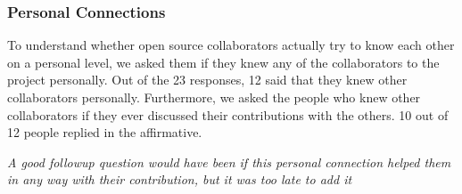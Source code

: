 \subsubsection{Personal Connections}

To understand whether open source collaborators actually try to know each other on a personal level, we asked them if they knew any of the collaborators to the project personally. Out of the 23 responses, 12 said that they knew other collaborators personally. Furthermore, we asked the people who knew other collaborators if they ever discussed their contributions with the others. 10 out of 12 people replied in the affirmative. 

{\it A good followup question would have been if this personal connection helped them in any way with their contribution, but it was too late to add it}

